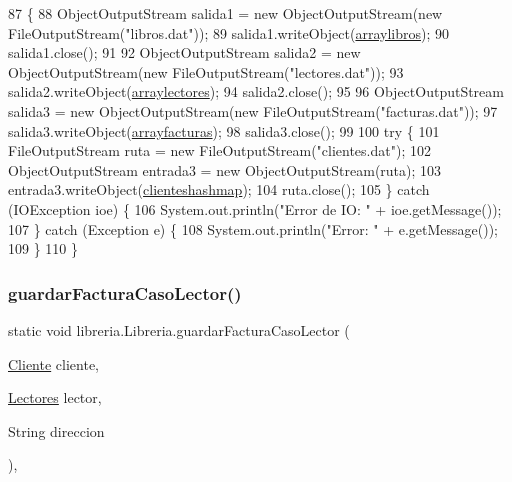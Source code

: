 \begin{DoxyCode}
87                                                                                 \{
88          ObjectOutputStream salida1 = \textcolor{keyword}{new} ObjectOutputStream(\textcolor{keyword}{new} FileOutputStream(\textcolor{stringliteral}{"libros.dat"}));
89          salida1.writeObject(\mbox{\hyperlink{classlibreria_1_1_libreria_aa55c2bad2db92eb94ea1ba9c6997f47d}{arraylibros}});
90          salida1.close();
91          
92          ObjectOutputStream salida2 = \textcolor{keyword}{new} ObjectOutputStream(\textcolor{keyword}{new} FileOutputStream(\textcolor{stringliteral}{"lectores.dat"}));
93          salida2.writeObject(\mbox{\hyperlink{classlibreria_1_1_libreria_ac9e002dcb370eb6caa314d18cf14a293}{arraylectores}});
94          salida2.close();
95          
96          ObjectOutputStream salida3 = \textcolor{keyword}{new} ObjectOutputStream(\textcolor{keyword}{new} FileOutputStream(\textcolor{stringliteral}{"facturas.dat"}));
97          salida3.writeObject(\mbox{\hyperlink{classlibreria_1_1_libreria_a1b6aaea2b6d1d95a7e25b85881e82721}{arrayfacturas}});
98          salida3.close();
99          
100          \textcolor{keywordflow}{try} \{
101             FileOutputStream ruta = \textcolor{keyword}{new} FileOutputStream(\textcolor{stringliteral}{"clientes.dat"});
102             ObjectOutputStream entrada3 = \textcolor{keyword}{new} ObjectOutputStream(ruta);
103             entrada3.writeObject(\mbox{\hyperlink{classlibreria_1_1_libreria_a9bb86627af6c43f97367c8a28d9f0d3e}{clienteshashmap}});
104             ruta.close();
105         \} \textcolor{keywordflow}{catch} (IOException ioe) \{
106             System.out.println(\textcolor{stringliteral}{"Error de IO: "} + ioe.getMessage());
107         \} \textcolor{keywordflow}{catch} (Exception e) \{
108             System.out.println(\textcolor{stringliteral}{"Error: "} + e.getMessage());
109         \}
110     \}
\end{DoxyCode}
\mbox{\label{classlibreria_1_1_libreria_a6a77f1405b57c77f702d8438aec968e8}} 
\subsubsection{\texorpdfstring{guardar\+Factura\+Caso\+Lector()}{guardarFacturaCasoLector()}}
{\footnotesize\ttfamily static void libreria.\+Libreria.\+guardar\+Factura\+Caso\+Lector (\begin{DoxyParamCaption}\item[{\mbox{\hyperlink{classlibreria_1_1_cliente}{Cliente}}}]{cliente,  }\item[{\mbox{\hyperlink{classlibreria_1_1_lectores}{Lectores}}}]{lector,  }\item[{String}]{direccion }\end{DoxyParamCaption})\hspace{0.3cm}{\ttfamily [inline]}, {\ttfamily [static]}}


